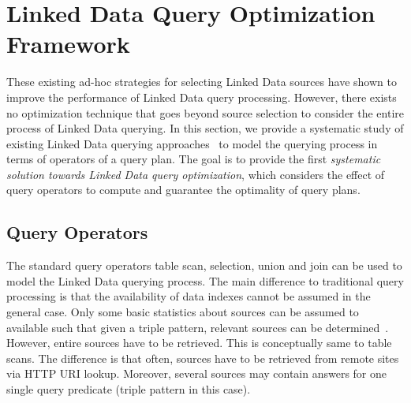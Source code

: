 \section{Linked Data Query Optimization Framework}
\label{sec:framework}
These existing ad-hoc strategies for selecting Linked Data sources have shown to improve the performance of Linked Data query processing. However, there exists no optimization technique that goes beyond source selection to consider the entire process of Linked Data querying. In this section, we provide a systematic study of existing Linked Data querying approaches~\cite{hartig_executing_2009,harth_data_2010,ladwig_linked_2010} to model the querying process in terms of operators of a query plan. The goal is to provide the first \emph{systematic solution towards Linked Data query optimization}, which considers the effect of query operators to compute and guarantee the optimality of query plans. 


\subsection{Query Operators}
\label{sec:ops}
The standard query operators table scan, selection, union and join can be used to model the Linked Data querying process. The main difference to traditional query processing is that the availability of data indexes cannot be assumed in the general case. Only some basic statistics about sources can be assumed to available such that given a triple pattern, relevant sources can be determined~\cite{harth_data_2010,ladwig_linked_2010}. However, entire sources have to be retrieved. This is conceptually same to table scans. The difference is that often, sources have to be retrieved from remote sites via HTTP URI lookup. Moreover, several sources may contain answers for one single query predicate (triple pattern in this case).  

